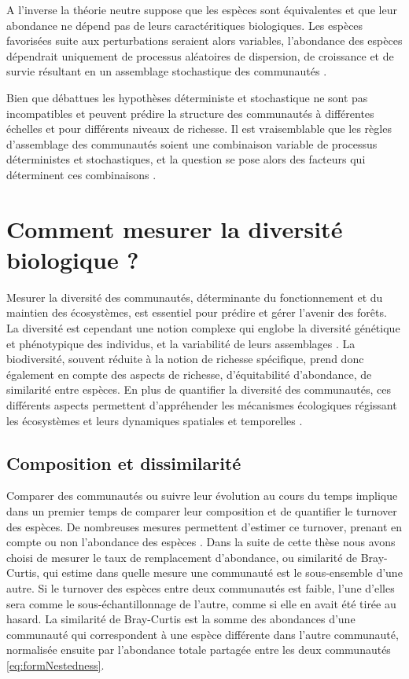 \documentclass[
  11pt,
  french,
  A4paper,
  extrafontsizes,onecolumn,openright
  ]{memoir}
\begin{document}
A l'inverse la théorie neutre suppose que les espèces sont équivalentes
et que leur abondance ne dépend pas de leurs caractéritiques
biologiques. Les espèces favorisées suite aux perturbations seraient
alors variables, l'abondance des espèces dépendrait uniquement de
processus aléatoires de dispersion, de croissance et de survie résultant
en un assemblage stochastique des communautés \autocite{Hubbell2001}.

Bien que débattues les hypothèses déterministe et stochastique ne sont
pas incompatibles et peuvent prédire la structure des communautés à
différentes échelles et pour différents niveaux de richesse. Il est
vraisemblable que les règles d'assemblage des communautés soient une
combinaison variable de processus déterministes et stochastiques, et la
question se pose alors des facteurs qui déterminent ces combinaisons
\autocite{Chave2004}.

\section{Comment mesurer la diversité biologique
?}\label{comment-mesurer-la-diversite-biologique}

Mesurer la diversité des communautés, déterminante du fonctionnement et
du maintien des écosystèmes, est essentiel pour prédire et gérer
l'avenir des forêts. La diversité est cependant une notion complexe qui
englobe la diversité génétique et phénotypique des individus, et la
variabilité de leurs assemblages \autocite{Loreau2005}. La biodiversité,
souvent réduite à la notion de richesse spécifique, prend donc également
en compte des aspects de richesse, d'équitabilité d'abondance, de
similarité entre espèces. En plus de quantifier la diversité des
communautés, ces différents aspects permettent d'appréhender les
mécanismes écologiques régissant les écosystèmes et leurs dynamiques
spatiales et temporelles \autocites{Purvis2000}{Loreau2005}.

\subsection{Composition et
dissimilarité}\label{composition-et-dissimilarite}

Comparer des communautés ou suivre leur évolution au cours du temps
implique dans un premier temps de comparer leur composition et de
quantifier le turnover des espèces. De nombreuses mesures permettent
d'estimer ce turnover, prenant en compte ou non l'abondance des espèces
\autocite{Podani2013}. Dans la suite de cette thèse nous avons choisi de
mesurer le taux de remplacement d'abondance, ou similarité de
Bray-Curtis, qui estime dans quelle mesure une communauté est le
sous-ensemble d'une autre. Si le turnover des espèces entre deux
communautés est faible, l'une d'elles sera comme le sous-échantillonnage
de l'autre, comme si elle en avait été tirée au hasard. La similarité de
Bray-Curtis est la somme des abondances d'une communauté qui
correspondent à une espèce différente dans l'autre communauté,
normalisée ensuite par l'abondance totale partagée entre les deux
communautés \eqref{eq:formNestedness}.
\end{document}
